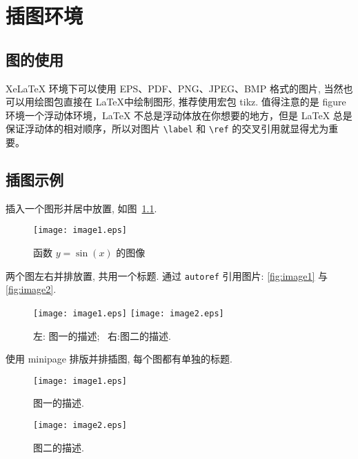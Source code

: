\documentclass[master]{shnuthesis}
\begin{document}

\chapter{插图环境}

\section{图的使用}

XeLaTeX 环境下可以使用 EPS、PDF、PNG、JPEG、BMP 格式的图片, 当然也可以用绘图包直接在 \LaTeX 中绘制图形, 推荐使用宏包 tikz. 值得注意的是 figure 环境一个浮动体环境，LaTeX 不总是浮动体放在你想要的地方，但是 LaTeX 总是保证浮动体的相对顺序，所以对图片 \verb|\label| 和 \verb|\ref| 的交叉引用就显得尤为重要。

\section{插图示例}

插入一个图形并居中放置, 如图~\ref{fig:sinx}.
\begin{figure}[htp!]
  \centering
  \texttt{[image: image1.eps]}
  \caption{函数 $y=\sin(x)$ 的图像}\label{fig:sinx}
\end{figure}

两个图左右并排放置, 共用一个标题. 通过 \verb|autoref| 引用图片: \autoref{fig:image1} 与 \autoref{fig:image2}.
\begin{figure}[htp!]
\centering
  \texttt{[image: image1.eps]}
  \hfill
  \texttt{[image: image2.eps]}
  \caption{左: 图一的描述;~ 右:图二的描述.}
  \label{fig:image}
\end{figure}

\clearpage
使用 minipage 排版并排插图, 每个图都有单独的标题.
\begin{figure}[htp!]
\begin{minipage}[t]{0.48\linewidth}
\centering
  \texttt{[image: image1.eps]}
    \caption{图一的描述.}
    \label{fig:image1}
\end{minipage}
  \hfill
\begin{minipage}[t]{0.48\linewidth}
\centering
   \texttt{[image: image2.eps]}
   \caption{图二的描述.}
   \label{fig:image2}
\end{minipage}
\end{figure}
\end{document}
